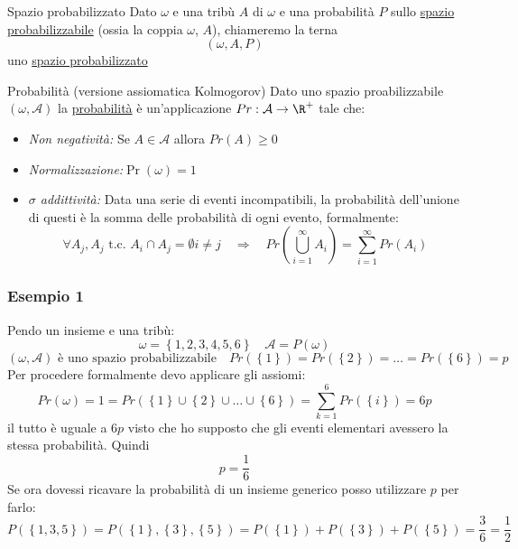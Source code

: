 \begin{definizione}{Spazio probabilizzato}
	Dato $ \omega  $ e una tribù $ A $ di $ \omega $ e una probabilità $ P $ sullo \underline{spazio probabilizzabile} (ossia la coppia $ \omega $, $ A $), chiameremo la terna
	\[
		(\omega, A, P)
	\]
	uno \underline{spazio probabilizzato}
\end{definizione}

\begin{definizione}{Probabilità (versione assiomatica Kolmogorov)}
	Dato uno spazio proabilizzabile $ \left(\omega , \mathcal{A}\right) $ la \underline{probabilità} è un'applicazione $ Pr: \mathcal{A} \to \R ^{+} $  tale che:
	\begin{itemize}
		\item \textit{Non negatività:} Se $A \in \mathcal{A} $ allora $ Pr\left(A\right) \ge 0 $
		\item \textit{Normalizzazione:}$ \Pr\left(\omega \right)=1 $
		\item \textit{$ \sigma $ addittività:} Data una serie di eventi incompatibili, la probabilità dell'unione di questi è la somma delle probabilità di ogni evento, formalmente:
		      \[
			      \forall A_j, A_j \text{ t.c. } A_i \cap A_j = \emptyset i \neq j \quad \Rightarrow \quad Pr\left(\bigcup _{i=1}^{\infty }A_i\right) = \sum_{i=1}^{\infty} Pr\left(A_i\right)
		      \]
	\end{itemize}
\end{definizione}
\subsubsection*{Esempio 1}
Pendo un insieme e una tribù:
\[
	\omega = \left\{1,2,3,4,5,6\right\} \quad \mathcal{A} = P\left(\omega\right)
\]
\[
	\left(\omega , \mathcal{A} \right) \text{ è uno spazio probabilizzabile} \quad Pr\left(\left\{1\right\}\right)= Pr\left(\left\{2\right\}\right) = \ldots = Pr\left(\left\{6\right\}\right) = p
\]
Per procedere formalmente devo applicare gli assiomi:
\[
	Pr\left(\omega \right)= 1= Pr\left(\left\{1\right\} \cup  \left\{2\right\} \cup   \ldots \cup  \left\{6\right\} \right)= \sum_{k=1}^{6} Pr\left(\left\{i\right\}\right) = 6p
\]
il tutto è uguale a $ 6p $ visto che ho supposto che gli eventi elementari avessero la stessa probabilità. Quindi
\[
	p=\frac{1}{6}
\]
Se ora dovessi ricavare la probabilità di un insieme generico posso utilizzare $ p $ per farlo:
\[
	P\left(\left\{1,3,5\right\}\right) = P\left(\left\{1\right\},\left\{3\right\},\left\{5\right\}\right)=P\left(\left\{1\right\}\right)+ P\left(\left\{3\right\}\right) + P\left(\left\{5\right\}\right)=\frac{3}{6} = \frac{1}{2}
\]
